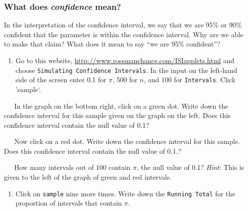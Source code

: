 \documentclass[
]{report}
\providecommand{\tightlist}{%
  \setlength{\itemsep}{0pt}\setlength{\parskip}{0pt}}
\begin{document}
\vspace{0.5in}

\newpage

\hypertarget{what-does-confidence-mean}{%
\subsubsection{\texorpdfstring{What does \emph{confidence} mean?}{What does confidence mean?}}\label{what-does-confidence-mean}}

In the interpretation of the confidence interval, we say that we are 95\% or 90\% confident that the parameter is within the confidence interval. Why are we able to make that claim? What does it mean to say ``we are 95\% confident''?

\begin{enumerate}
\def\labelenumi{\arabic{enumi}.}
\setcounter{enumi}{15}
\tightlist
\item
  Go to this website, \url{http://www.rossmanchance.com/ISIapplets.html} and choose \texttt{Simulating\ Confidence\ Intervals}. In the input on the left-hand side of the screen enter 0.1 for \(\pi\), 500 for \(n\), and 100 for \texttt{Intervals}. Click 'sample`.
  \vspace{1mm}
\end{enumerate}

~~~In the graph on the bottom right, click on a green dot. Write down the confidence interval for this sample given on the graph on the left. Does this confidence interval contain the null value of 0.1?

\vspace{0.5in}

~~~Now click on a red dot. Write down the confidence interval for this sample. Does this confidence interval contain the null value of 0.1.?

\vspace{0.5in}

~~~How many intervals out of 100 contain \(\pi\), the null value of 0.1? \emph{Hint}: This is given to the left of the graph of green and red intervals.

\vspace{0.5in}

\begin{enumerate}
\def\labelenumi{\arabic{enumi}.}
\setcounter{enumi}{16}
\tightlist
\item
  Click on \texttt{sample} nine more times. Write down the \texttt{Running\ Total} for the proportion of intervals that contain \(\pi\).
\end{enumerate}
\end{document}
